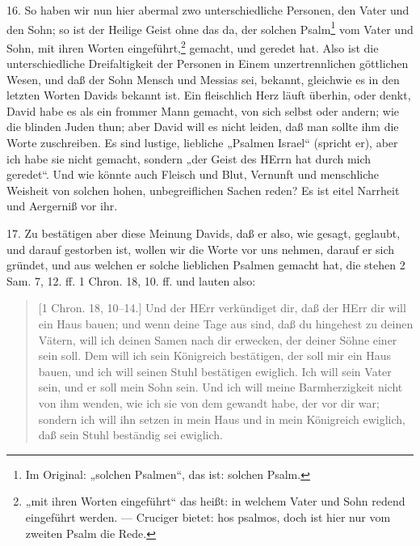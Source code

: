 16. So haben wir nun hier abermal zwo unterschiedliche Personen, den Vater und den Sohn; so ist der Heilige Geist ohne das da, der solchen Psalm\footnote{Im Original: „solchen Psalmen“, das ist: solchen Psalm.} vom Vater und Sohn, mit ihren Worten eingeführt,\footnote{„mit ihren Worten eingeführt“ das heißt: in welchem Vater und Sohn redend eingeführt werden. — Cruciger bietet: hos psalmos, doch ist hier nur vom zweiten Psalm die Rede.} gemacht, und geredet hat. Also ist die unterschiedliche Dreifaltigkeit der Personen in Einem unzertrennlichen göttlichen Wesen, und daß der Sohn Mensch und Messias sei, bekannt, gleichwie es in den letzten Worten Davids bekannt ist. Ein fleischlich Herz läuft überhin, oder denkt, David habe es als ein frommer Mann gemacht, von sich selbst oder andern; wie die blinden Juden thun; aber David will es nicht leiden, daß man sollte ihm die Worte zuschreiben. Es sind lustige, liebliche „Psalmen Israel“ (spricht er), aber ich habe sie nicht gemacht, sondern „der Geist des HErrn hat durch mich geredet“. Und wie könnte auch Fleisch und Blut, Vernunft und menschliche Weisheit von solchen hohen, unbegreiflichen Sachen reden? Es ist eitel Narrheit und Aergerniß vor ihr.

17. Zu bestätigen aber diese Meinung Davids, daß er also, wie gesagt, geglaubt, und darauf gestorben ist, wollen wir die Worte vor uns nehmen, darauf er sich gründet, und aus welchen er solche lieblichen Psalmen gemacht hat, die stehen 2 Sam. 7, 12. ff. 1 Chron. 18, 10. ff. und lauten also:

\begin{quote}
[1 Chron. 18, 10–14.] Und der HErr verkündiget dir, daß der HErr dir will ein Haus bauen; und wenn deine Tage aus sind, daß du hingehest zu deinen Vätern, will ich deinen Samen nach dir erwecken, der deiner Söhne einer sein soll. Dem will ich sein Königreich bestätigen, der soll mir ein Haus bauen, und ich will seinen Stuhl bestätigen ewiglich. Ich will sein Vater sein, und er soll mein Sohn sein. Und ich will meine Barmherzigkeit nicht von ihm wenden, wie ich sie von dem gewandt habe, der vor dir war; sondern ich will ihn setzen in mein Haus und in mein Königreich ewiglich, daß sein Stuhl beständig sei ewiglich.
\end{quote}

